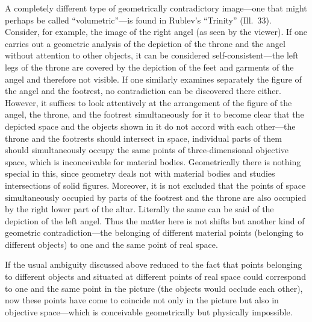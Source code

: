 
A completely different type of geometrically contradictory image---one that might perhaps
be called ``volumetric''---is found in Rublev's ``Trinity'' (Ill.~33).  Consider, for
example, the image of the right angel (as seen by the viewer).  If one carries out a
geometric analysis of the depiction of the throne and the angel without attention to
other objects, it can be considered self-consistent---the left legs of the throne are
covered by the depiction of the feet and garments of the angel and therefore not visible.
If one similarly examines separately the figure of the angel and the footrest, no
contradiction can be discovered there either.  However, it suffices to look attentively
at the arrangement of the figure of the angel, the throne, and the footrest simultaneously
for it to become clear that the depicted space and the objects shown in it do not accord
with each other---the throne and the footrests should intersect in space, individual parts
of them should simultaneously occupy the same points of three-dimensional objective
space, which is inconceivable for material bodies.  Geometrically there is nothing
special in this, since geometry deals not with material bodies and studies intersections
of solid figures.  Moreover, it is not excluded that the points of space simultaneously
occupied by parts of the footrest and the throne are also occupied by the right lower
part of the altar.  Literally the same can be said of the depiction of the left angel.
Thus the matter here is not shifts but another kind of geometric contradiction---the
belonging of different material points (belonging to different objects) to one and the
same point of real space.



If the usual ambiguity discussed above reduced to the fact that points belonging to
different objects and situated at different points of real space could correspond to one
and the same point in the picture (the objects would occlude each other), now these
points have come to coincide not only in the picture but also in objective space---which
is conceivable geometrically but physically impossible.

